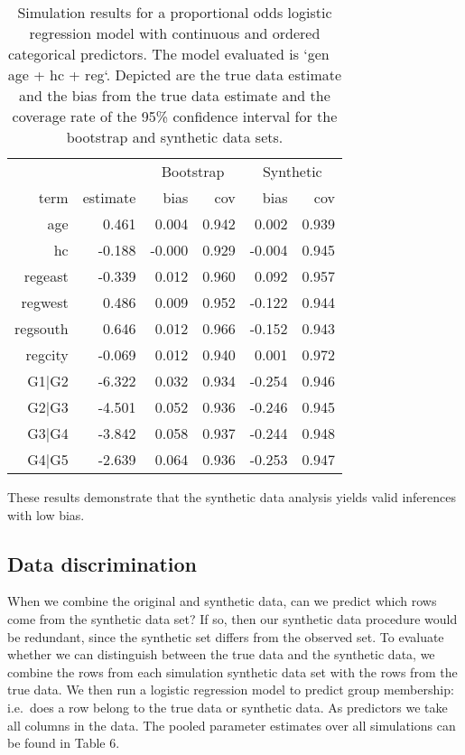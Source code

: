 \documentclass[psych,article,submit,moreauthors,pdftex]{mdpi}
\begin{document}
\begin{table}[H]
\caption{Simulation results for a proportional odds logistic regression model with continuous and ordered categorical predictors. The model evaluated is `gen ~ age + hc + reg`. Depicted are the true data estimate and the bias from the true data estimate and the coverage rate of the 95\% confidence interval for the bootstrap and synthetic data sets.}
\centering
\begin{tabular}{rrrrrr}
  \hline
 & & \multicolumn{2}{c}{Bootstrap} & \multicolumn{2}{c}{Synthetic}\\
 term & estimate & bias & cov & bias & cov \\ 
  \hline
  age & 0.461 & 0.004 & 0.942 & 0.002 & 0.939 \\
  hc & -0.188 & -0.000 & 0.929 & -0.004 & 0.945 \\
  regeast & -0.339 & 0.012 & 0.960 & 0.092 & 0.957\\
  regwest & 0.486 & 0.009 & 0.952 & -0.122 & 0.944\\
  regsouth & 0.646 & 0.012 & 0.966 & -0.152 & 0.943 \\
  regcity & -0.069 & 0.012 & 0.940 & 0.001 & 0.972 \\
  G1$|$G2 & -6.322 & 0.032 & 0.934 & -0.254 & 0.946 \\
  G2$|$G3 & -4.501 & 0.052 & 0.936 & -0.246 & 0.945 \\
  G3$|$G4 & -3.842 & 0.058 & 0.937 & -0.244 & 0.948 \\
  G4$|$G5 & -2.639 & 0.064 & 0.936 & -0.253 & 0.947 \\
   \hline
\end{tabular}
\end{table}

These results demonstrate that the synthetic data analysis yields valid
inferences with low bias.

\hypertarget{data-discrimination}{%
\subsection{Data discrimination}\label{data-discrimination}}

When we combine the original and synthetic data, can we predict which
rows come from the synthetic data set? If so, then our synthetic data
procedure would be redundant, since the synthetic set differs from the
observed set. To evaluate whether we can distinguish between the true
data and the synthetic data, we combine the rows from each simulation
synthetic data set with the rows from the true data. We then run a
logistic regression model to predict group membership: i.e.~does a row
belong to the true data or synthetic data. As predictors we take all
columns in the data. The pooled parameter estimates over all simulations
can be found in Table 6.
\end{document}
